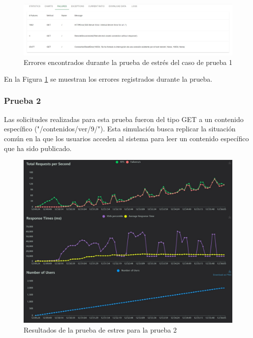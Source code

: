 \documentclass[10pt,times,twocolumn]{article}
\begin{document}
\begin{figure}[H]
	\centering
	\includegraphics[width=\linewidth]{fig/prueba1_grafico2.jpeg}
	\caption{Errores encontrados durante la prueba de estrés del caso de prueba 1}
	\label{fig:prueba1_grafico2}
\end{figure}

En la Figura \ref{fig:prueba1_grafico2} se muestran los errores registrados durante la prueba.

\subsubsection{Prueba 2}

Las solicitudes realizadas para esta prueba fueron del tipo GET a un contenido específico ("/contenidos/ver/9/"). Esta simulación busca replicar la situación común en la que los usuarios acceden al sistema para leer un contenido específico que ha sido publicado.

\begin{figure}[H]
	\centering
	\includegraphics[width=\linewidth]{fig/prueba2_grafico1.jpeg}
	\caption{Resultados de la prueba de estres para la prueba 2}
	\label{fig:prueba2_grafico1}
\end{figure}
\end{document}
